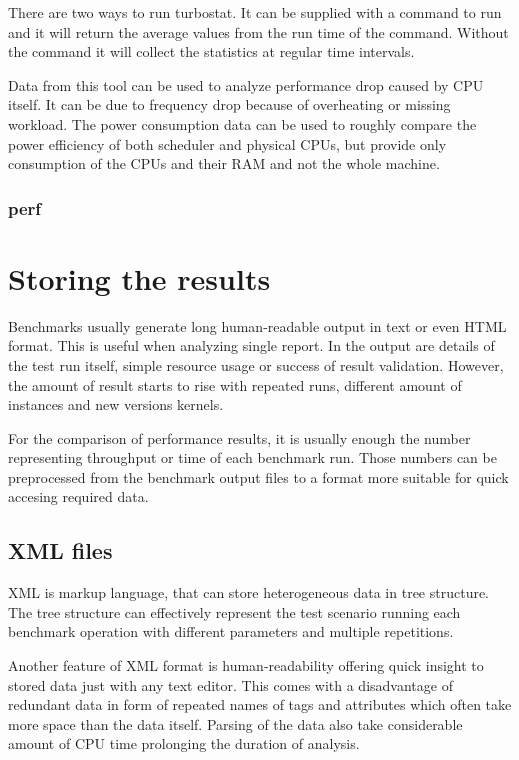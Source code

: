 There are two ways to run turbostat. It can be supplied with a command to run
and it will return the average values from the run time of the command. Without
the command it will collect the statistics at regular time intervals.

Data from this tool can be used to analyze performance drop caused by CPU
itself. It can be due to frequency drop because of overheating or missing
workload. The power consumption data can be used to roughly compare the power
efficiency of both scheduler and physical CPUs, but provide only consumption of
the CPUs and their RAM and not the whole machine.

\subsection{perf}


\chapter{Storing the results}
Benchmarks usually generate long human-readable output in text or even HTML
format. This is useful when analyzing single report. In the output are details
of the test run itself, simple resource usage or success of result validation.
However, the amount of result starts to rise with repeated runs, different
amount of instances and new versions kernels.

For the comparison of performance results, it is usually enough the number
representing throughput or time of each benchmark run. Those numbers can be
preprocessed from the benchmark output files to a format more suitable for quick
accesing required data.

\section{XML files}
XML is markup language, that can store heterogeneous data in tree structure.
The tree structure can effectively represent the test scenario running each
benchmark operation with different parameters and multiple repetitions.

Another feature of XML format is human-readability offering quick insight to stored
data just with any text editor.
This comes with a disadvantage of redundant data in form of repeated names of
tags and attributes which often take more space than the data itself. Parsing of
the data also take considerable amount of CPU time prolonging the duration of
analysis.

